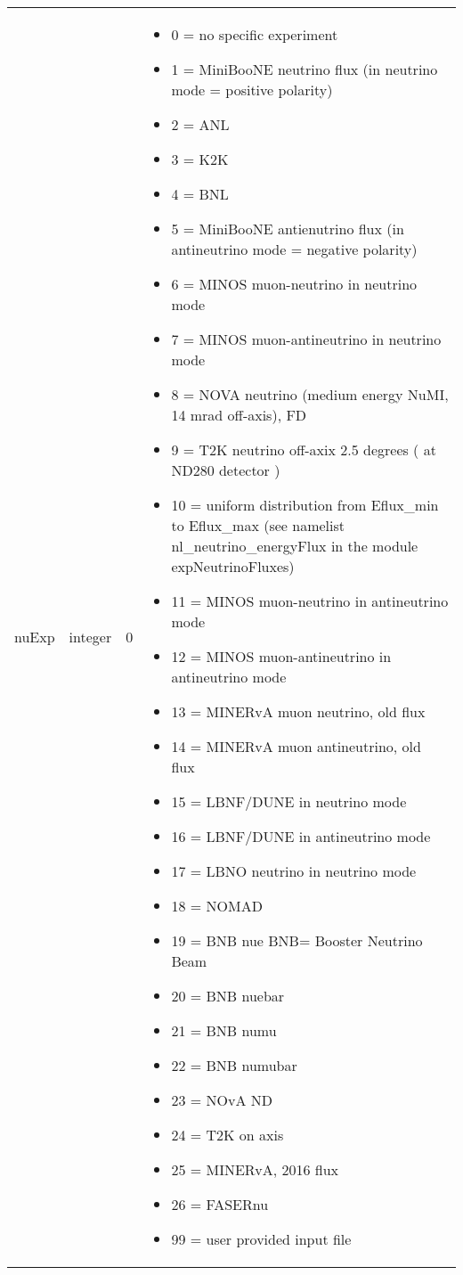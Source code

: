 \documentclass{article}
\begin{document}
\begin{longtable}{llll}
nuExp & \begin{minipage}[t]{2cm}integer\end{minipage} & \begin{minipage}[t]{2cm}0\end{minipage} & \begin{minipage}[t]{12cm}\begin{itemize}\leftmargin0em\itemindent0pt\item 0 = no specific experiment\item 1 = MiniBooNE neutrino flux (in neutrino mode = positive polarity)\item 2 = ANL\item 3 = K2K\item 4 = BNL\item 5 = MiniBooNE antienutrino flux (in antineutrino mode = negative polarity)\item 6 = MINOS muon-neutrino  in neutrino mode\item 7 = MINOS muon-antineutrino  in neutrino mode\item 8 = NOVA neutrino (medium energy NuMI, 14 mrad off-axis), FD\item 9 = T2K neutrino off-axix 2.5 degrees ( at ND280 detector )\item 10 = uniform distribution from Eflux\_min to Eflux\_max       (see namelist nl\_neutrino\_energyFlux in the module expNeutrinoFluxes)\item 11 = MINOS muon-neutrino  in antineutrino mode\item 12 = MINOS muon-antineutrino  in antineutrino mode\item 13 = MINERvA muon neutrino, old flux\item 14 = MINERvA muon antineutrino, old flux\item 15 = LBNF/DUNE in neutrino mode\item 16 = LBNF/DUNE in antineutrino mode\item 17 = LBNO neutrino in neutrino mode\item 18 = NOMAD\item 19 = BNB nue          BNB= Booster Neutrino Beam\item 20 = BNB nuebar\item 21 = BNB numu\item 22 = BNB numubar\item 23 = NOvA ND\item 24 = T2K on axis\item 25 = MINERvA, 2016 flux\item 26 = FASERnu\item 99 = user provided input file\end{itemize}\end{minipage}\\*

\end{longtable}
\end{document}
